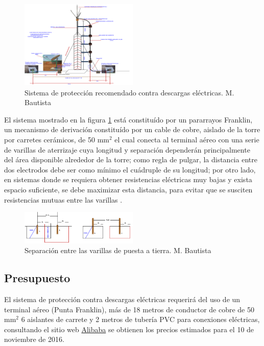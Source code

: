 \documentclass[11pt, a4paper, twosides]{report}
\begin{document}
\begin{figure}[h]
    \centering
    \includegraphics[width=0.5\textwidth]{fig11.png}
    \caption{Sistema de protección recomendado contra descargas eléctricas. M. Bautista}
    \label{fig:11}
\end{figure}

El sistema mostrado en la figura \ref{fig:11} está constituído por un pararrayos Franklin, un mecanismo de derivación constituído por un cable de cobre, aislado de la torre por carretes cerámicos, de 50 mm$^{2}$ el cual conecta al terminal aéreo con una serie de varillas de aterrizaje cuya longitud y separación dependerán principalmente del área disponible alrededor de la torre; como regla de pulgar, la distancia entre dos electrodos debe ser como mínimo el cuádruple de su longitud; por otro lado, en sistemas donde se requiera obtener resistencias eléctricas muy bajas y exista espacio suficiente, se debe maximizar esta distancia, para evitar que se susciten resistencias mutuas entre las varillas \cite{bautista2015}.

\begin{figure}[h]
    \centering
    \includegraphics[width=0.5\textwidth]{fig12.png}
    \caption{Separación entre las varillas de puesta a tierra. M. Bautista}
    \label{fig:12}
\end{figure}

\subsection{Presupuesto}
El sistema de protección contra descargas eléctricas requerirá del uso de un terminal aéreo (Punta Franklin), más de 18 metros de conductor de cobre de 50 mm$^{2}$ 6 aislantes de carrete y 2 metros de tubería PVC para conexiones eléctricas, consultando el sitio web \href{http://alibaba.com}{Alibaba} se obtienen los precios estimados para el 10 de noviembre de 2016.
\end{document}
